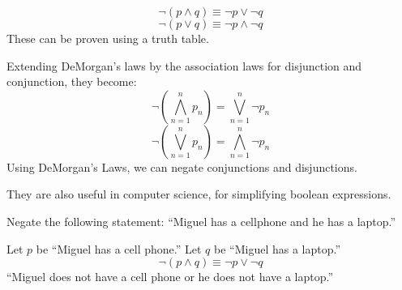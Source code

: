 \begin{equation}
  \neg (p \land q) \equiv \neg p \lor \neg q
\end{equation}
\begin{equation}
  \neg(p \lor q) \equiv \neg p \land \neg q
\end{equation}
These can be proven using a truth table.
\begin{table}[H]
  \centering
  \caption{A proof of DeMorgan's first law.}
\end{table}
\begin{table}[H]
  \centering
  \caption{A proof of DeMorgan's second law.}
\end{table}


Extending DeMorgan's laws by the association laws for disjunction and conjunction, they become:
\begin{equation}
 \neg\left(\bigwedge^n_{n=1} p_n\right)=\bigvee^n_{n=1} \neg p_n
\end{equation}
\begin{equation}
 \neg\left(\bigvee^n_{n=1} p_n\right)=\bigwedge^n_{n=1} \neg p_n
\end{equation}
Using DeMorgan's Laws, we can negate conjunctions and disjunctions.

They are also useful in computer science, for simplifying boolean expressions.

\begin{ex}
  Negate the following statement:
  ``Miguel has a cellphone and he has a laptop.''
  \begin{sol}
    Let \(p\) be ``Miguel has a cell phone.''
    Let \(q\) be ``Miguel has a laptop.''
    \[ \neg(p \land q) \equiv \neg p \lor \neg q \]
    ``Miguel does not have a cell phone or he does not have a laptop.''
  \end{sol}
\end{ex}

